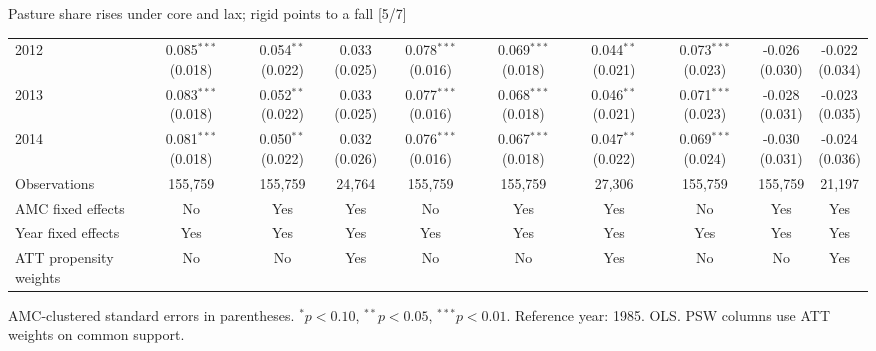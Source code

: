 \documentclass[aspectratio=169]{beamer}
\begin{document}
\begin{frame}{Pasture share rises under core and lax; rigid points to a fall [5/7]}
{\begin{tabular}{@{}l*{9}{c}@{}}
2012 & \shortstack{0.085$^{***}$\\(0.018)} & \shortstack{0.054$^{**}$\\(0.022)} & \shortstack{0.033\\(0.025)} & \shortstack{0.078$^{***}$\\(0.016)} & \shortstack{0.069$^{***}$\\(0.018)} & \shortstack{0.044$^{**}$\\(0.021)} & \shortstack{0.073$^{***}$\\(0.023)} & \shortstack{-0.026\\(0.030)} & \shortstack{-0.022\\(0.034)} \\
2013 & \shortstack{0.083$^{***}$\\(0.018)} & \shortstack{0.052$^{**}$\\(0.022)} & \shortstack{0.033\\(0.025)} & \shortstack{0.077$^{***}$\\(0.016)} & \shortstack{0.068$^{***}$\\(0.018)} & \shortstack{0.046$^{**}$\\(0.021)} & \shortstack{0.071$^{***}$\\(0.023)} & \shortstack{-0.028\\(0.031)} & \shortstack{-0.023\\(0.035)} \\
2014 & \shortstack{0.081$^{***}$\\(0.018)} & \shortstack{0.050$^{**}$\\(0.022)} & \shortstack{0.032\\(0.026)} & \shortstack{0.076$^{***}$\\(0.016)} & \shortstack{0.067$^{***}$\\(0.018)} & \shortstack{0.047$^{**}$\\(0.022)} & \shortstack{0.069$^{***}$\\(0.024)} & \shortstack{-0.030\\(0.031)} & \shortstack{-0.024\\(0.036)} \\
\midrule
Observations & 155,759 & 155,759 & 24,764 & 155,759 & 155,759 & 27,306 & 155,759 & 155,759 & 21,197 \\
AMC fixed effects & No & Yes & Yes & No & Yes & Yes & No & Yes & Yes \\
Year fixed effects & Yes & Yes & Yes & Yes & Yes & Yes & Yes & Yes & Yes \\
ATT propensity weights & No & No & Yes & No & No & Yes & No & No & Yes \\
\bottomrule
\end{tabular}%
}
\vspace{0.1em}
{\tiny\color{ZMidGray} AMC-clustered standard errors in parentheses. $^{*}p<0.10$, $^{**}p<0.05$, $^{***}p<0.01$. Reference year: 1985. OLS. PSW columns use ATT weights on common support.}
\end{frame}
\end{document}
